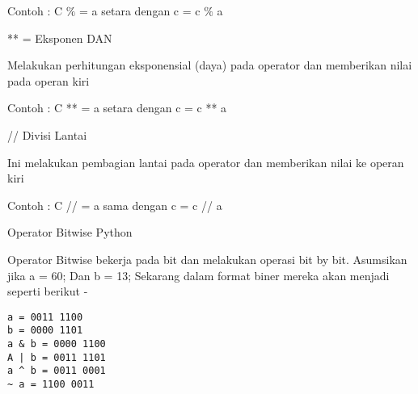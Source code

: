\noindent 
Contoh : C $  \%  $ = a setara dengan c = c $  \%  $ a \par
\noindent 
\vspace{12pt}
\noindent 
** = Eksponen DAN \par
\noindent 
Melakukan perhitungan eksponensial (daya) pada operator dan memberikan nilai pada operan kiri \par
\noindent 
Contoh : C ** = a setara dengan c = c ** a \par
\noindent 
\vspace{12pt}
\noindent 
// Divisi Lantai \par
\noindent 
Ini melakukan pembagian lantai pada operator dan memberikan nilai ke operan kiri \par
\noindent 
Contoh : C // = a sama dengan c = c // a \par
\noindent 
\vspace{12pt}
\noindent 
Operator Bitwise Python \par
\vspace{12pt}
\noindent 
Operator Bitwise bekerja pada bit dan melakukan operasi bit by bit. $  $Asumsikan jika a = 60; $  $Dan b = 13; $  $Sekarang dalam format biner mereka akan menjadi seperti berikut - \par

\begin{verbatim}
a = 0011 1100
b = 0000 1101
a & b = 0000 1100
A | b = 0011 1101
a ^ b = 0011 0001
~ a = 1100 0011
\end{verbatim}

